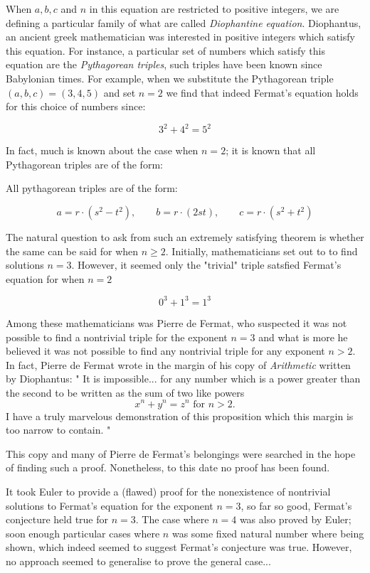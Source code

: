 When $a, b, c$ and $n$ in this equation are restricted to positive integers, we are defining a particular family of what are called \textit{Diophantine equation}.
Diophantus, an ancient greek mathematician was interested in positive integers which satisfy this equation. For instance, a particular set of numbers which satisfy this equation 
are the \textit{Pythagorean triples}, such triples have been known since Babylonian times. For example, when we substitute the Pythagorean triple $(a,b,c) = (3,4,5)$ and set $n = 2$ we find that 
indeed Fermat's equation holds for this choice of numbers since:

\[
3^2 + 4^2 = 5^2
\]

In fact, much is known about the case when $n = 2$; it is known that all Pythagorean triples are of the form:

\begin{theorem}
    All pythagorean triples are of the form:

    \[
    a = r \cdot (s^2 - t^2), \qquad b = r \cdot (2st), \qquad c = r \cdot (s^2 + t^2)
    \]
\end{theorem}

The natural question to ask from such an extremely satisfying theorem is whether the same can be said for when $n \ge 2$. Initially, mathematicians set out to
to find solutions $n = 3$. However, it seemed only the "trivial" triple satsfied Fermat's equation for when $n = 2$

\[
0^3 + 1^3 = 1^3
\]

Among these mathematicians was Pierre de Fermat, who suspected it was not possible to find a nontrivial triple for the exponent $n= 3$ and what is more he believed
it was not possible to find any nontrivial triple for any exponent $n > 2$. In fact, Pierre de Fermat wrote in the margin of his copy of \textit{Arithmetic} written by Diophantus:
"
It is impossible... for any number which is a power greater than the second to be written as the sum of two like powers 
\[ 
x^n + y^n = z^n \text{ for } n > 2.
\]
I have a truly marvelous demonstration of this proposition which this margin is too narrow to contain.
"

This copy and many of Pierre de Fermat's belongings were searched in the hope of finding such a proof. Nonetheless, to this date no proof has been found.


It took Euler to provide a (flawed) proof for the nonexistence of nontrivial solutions to Fermat's equation for the exponent $n = 3$, so far so good, Fermat's conjecture held true for $n = 3$.
The case where $n = 4$ was also proved by Euler; soon enough particular cases where $n$ was some fixed natural number where being shown, which indeed seemed to suggest Fermat's conjecture was true.
However, no approach seemed to generalise to prove the general case...

